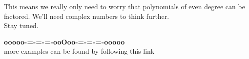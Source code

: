 \documentclass{ximera}
\begin{document}
This means we really only need to worry that polynomials of even degree can be factored.  We'll need complex numbers to think further. \\


Stay tuned.

























\begin{center}
\textbf{\textcolor{green!50!black}{ooooo-=-=-=-ooOoo-=-=-=-ooooo}} \\

more examples can be found by following this link\\ 

\end{center}
\end{document}
